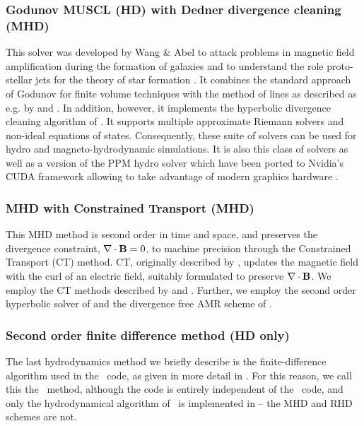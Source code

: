 
\subsubsection{Godunov MUSCL (HD) with Dedner divergence cleaning (MHD)}
This solver was developed by Wang \& Abel to attack problems in
magnetic field amplification during the formation of galaxies
\citep{Wang:2009a} and to understand the role proto-stellar jets for
the theory of star formation \citep{Wang:2009b}. It combines the standard
approach of Godunov \citep{Godunov1959} for finite volume techniques
with the method of lines as described as e.g. by
\cite{leveque2002finite} and \cite{toro-1997}. In addition, however,
it implements the hyperbolic divergence cleaning algorithm of
\cite{2002JCoPh.175..645D}. It supports multiple approximate Riemann
solvers and non-ideal equations of states. Consequently,
these suite of solvers can be used for hydro and magneto-hydrodynamic
simulations. It is also this class of solvers as well as a version of
the PPM hydro solver which have been ported to Nvidia's CUDA framework
allowing \enzo to take advantage of modern graphics hardware \citep{Wang:2010}.

\subsubsection{MHD with Constrained Transport (MHD)}
This MHD method is second order in time and space, and preserves the divergence constraint,
$\nabla \cdot \mathbf{B} = 0$, to machine precision through the Constrained Transport
(CT) method.  CT, originally described by \citet{Evans88}, updates the
magnetic field with the curl of an electric field, suitably formulated to
preserve $\nabla \cdot \mathbf{B}$.  We employ the CT methods
described by \citet{Balsara99} and \citet{Gardiner05}.  Further, we employ the
second order hyperbolic solver of \citet{Li08} and the divergence free AMR
scheme of \citet{Balsara01}.

\subsubsection{Second order finite difference method (HD only)}

The last hydrodynamics method we briefly describe is the
finite-difference algorithm used in the \zeus\ code, as given in more
detail in \citet{Stone92a}.  For this reason, we call this the \zeus\
method, although the code is entirely independent of the \zeus\ code,
and only the hydrodynamical algorithm of \zeus\ is implemented in
\enzo -- the MHD and RHD schemes are not.

